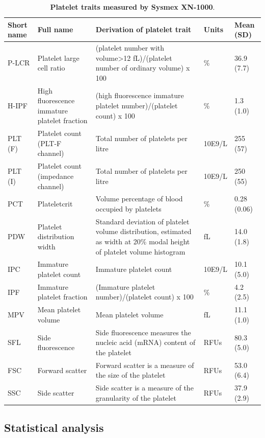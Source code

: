 \documentclass[11pt,twoside]{bristolthesis}
\begin{document}
\begin{landscape}\begin{table}

\caption[Platelet traits measured by Sysmex XN-1000]{\label{tab:Platelet-traits}\textbf{Platelet traits measured by Sysmex XN-1000}.}
\centering
\begin{tabu} to 
\toprule
Short name & Full name & Derivation of platelet trait & Units & Mean (SD)\\
\midrule
P-LCR & Platelet large cell ratio & (platelet number with volume>12 fL)/(platelet number of ordinary volume)  x 100 & \% & 36.9 (7.7)\\
H-IPF & High fluorescence immature platelet fraction & (high fluorescence immature platelet number)/(platelet count)  x 100 & \% & 1.3 (1.0)\\
PLT (F) & Platelet count (PLT-F channel) & Total number of platelets per litre & 10E9/L & 255 (57)\\
PLT (I) & Platelet count (impedance channel) & Total number of platelets per litre & 10E9/L & 250 (55)\\
PCT & Plateletcrit & Volume percentage of blood occupied by platelets & \% & 0.28 (0.06)\\
\addlinespace
PDW & Platelet distribution width & Standard deviation of platelet volume distribution, estimated as width at 20\% modal height of platelet volume histogram & fL & 14.0 (1.8)\\
IPC & Immature platelet count & Immature platelet count & 10E9/L & 10.1 (5.0)\\
IPF & Immature platelet fraction & (Immature platelet number)/(platelet count)   x 100 & \% & 4.2 (2.5)\\
MPV & Mean platelet volume & Mean platelet volume & fL & 11.1 (1.0)\\
SFL & Side fluorescence & Side fluorescence measures the nucleic acid (mRNA) content of the platelet & RFUs & 80.3 (5.0)\\
\addlinespace
FSC & Forward scatter & Forward scatter is a measure of the size of the platelet & RFUs & 53.0 (6.4)\\
SSC & Side scatter & Side scatter is a measure of the granularity of the platelet & RFUs & 37.9 (2.9)\\
\bottomrule
\end{tabu}
\end{table}
\end{landscape}
\hypertarget{statistical-analysis}{%
\subsection{Statistical analysis}\label{statistical-analysis}}
\end{document}
